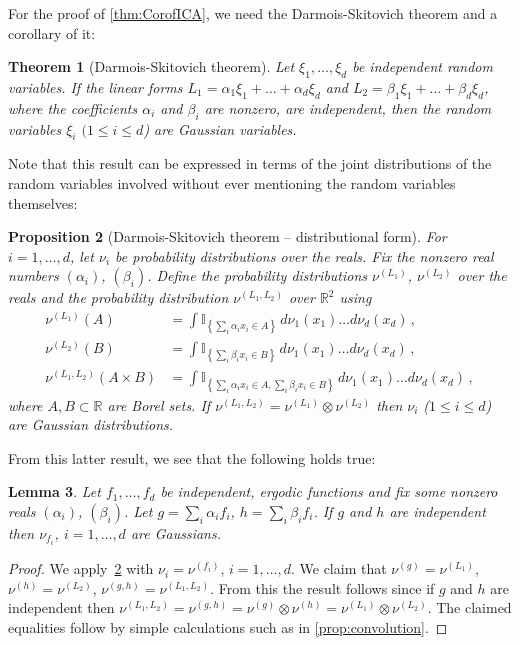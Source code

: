 \documentclass[english]{article} %
\newcommand{\todoc}[2][]{\todo[color=Apricot,#1]{#2}}
\newcommand{\cset}[2]{\left\{#1\,:\,#2\right\}}
\newcommand{\ind}[1]{\mathbb{I}_{\left\{ #1 \right\}}}
\newcommand{\real}{\mathbb{R}}
\newtheorem{lemma}{Lemma}[section]
\newtheorem{thm}[lemma]{Theorem}
\newtheorem{prop}[lemma]{Proposition}
\theoremstyle{definition}
\begin{document}
For the proof of \cref{thm:CorofICA}, we need the Darmois-Skitovich theorem and a corollary of it: \todoc{Add citation}
\begin{thm}[Darmois-Skitovich theorem]
Let $\xi_1,\ldots,\xi_d$ be independent random variables. If the linear forms $L_1 = \alpha_1\xi_1 + \ldots + \alpha_d\xi_d$ and $L_2 = \beta_1\xi_1 +\ldots + \beta_d\xi_d$, where the coefficients $\alpha_i$ and $\beta_i$ are nonzero, are independent, then the random variables $\xi_i$ $(1\le i \le d$) are Gaussian variables.
\end{thm}


Note that this result can  be expressed in terms of the joint distributions of the random variables involved without ever mentioning the random variables themselves:
\begin{prop}[Darmois-Skitovich theorem -- distributional form]
\label{prop:Darmois-Skitovich-distr}
For $i=1,\ldots, d$, let $\nu_i$ be probability distributions over the reals.
Fix the nonzero real numbers $(\alpha_i)$, $(\beta_i)$.
Define the probability distributions $\nu^{(L_1)}$, $\nu^{(L_2)}$ over the reals and 
the probability distribution
 $\nu^{(L_1,L_2)}$ over $\real^2$ using
\begin{align*}
\nu^{(L_1)}(A) & = \int \ind{ \sum_i \alpha_i x_i \in A} \,d\nu_1(x_1)\dots d\nu_d(x_d)\,,\\
\nu^{(L_2)}(B) & = \int \ind{ \sum_i \beta_i x_i \in B} \,d\nu_1(x_1)\dots d\nu_d(x_d)\,,\\
\nu^{(L_1,L_2)}(A\times B) 
& = \int \ind{ \sum_i \alpha_i x_i \in A, \sum_i \beta_i x_i\in B} \,d\nu_1(x_1)\dots d\nu_d(x_d)\,,
\end{align*}
where $A,B\subset \real$ are Borel sets.
If $\nu^{(L_1,L_2)} = \nu^{(L_1)} \otimes \nu^{(L_2)}$ then $\nu_i$ ($1\le i \le d$) are Gaussian distributions.
\end{prop}

From this latter result, we see that the following holds true:
\begin{lemma}
Let $f_1,\ldots,f_d$ be independent, ergodic functions and fix some nonzero reals
 $(\alpha_i)$, $(\beta_i)$.
Let $g = \sum_i \alpha_i f_i$, $h = \sum_i \beta_i f_i$.
If $g$ and $h$ are independent then $\nu_{f_i}$, $i=1,\ldots,d$ are Gaussians.
\end{lemma}
\begin{proof}
We apply~\cref{prop:Darmois-Skitovich-distr} with $\nu_i = \nu^{(f_i)}$, $i=1,\ldots,d$.
We claim that $\nu^{(g)} = \nu^{(L_1)}$, $\nu^{(h)} = \nu^{(L_2)}$,
$\nu^{(g,h)} = \nu^{(L_1,L_2)}$.
From this the result follows since if $g$ and $h$ are independent then $\nu^{(L_1,L_2)} = \nu^{(g,h)} = \nu^{(g)} \otimes \nu^{(h)} = \nu^{(L_1)} \otimes \nu^{(L_2)}$.
The claimed equalities follow by simple calculations such as in \cref{prop:convolution}. \todoc{At least I think..}
\end{proof}
\end{document}
